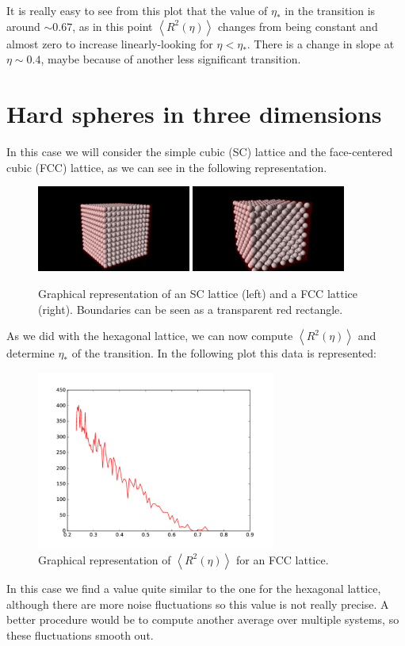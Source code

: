 \documentclass[10 pt]{article}
\newcommand{\avg}[1]{\left\langle #1 \right\rangle}
\begin{document}
It is really easy to see from this plot that the value of $\eta_*$ in the transition is around $\sim 0.67$, as in this point $\avg{R^2(\eta)}$ changes from being constant and almost zero to increase linearly-looking for $\eta < \eta_*$. There is a change in slope at $\eta \sim 0.4$, maybe because of another less significant transition.

\section{Hard spheres in three dimensions}

In this case we will consider the simple cubic (SC) lattice and the face-centered cubic (FCC) lattice, as we can see in the following representation.

\begin{figure}[H]
  \begin{center}
    \includegraphics[width=0.45\textwidth]{../graphs/sc.png}
    \includegraphics[width=0.45\textwidth]{../graphs/fcc.png}
    \caption{Graphical representation of an SC lattice (left) and a FCC lattice (right). Boundaries can be seen as a transparent red rectangle.}
  \end{center}
\end{figure}

As we did with the hexagonal lattice, we can now compute $\avg{R^2(\eta)}$ and determine $\eta_*$ of the transition. In the following plot this data is represented:

\begin{figure}[H]
  \begin{center}
    \includegraphics[width=0.7\textwidth]{../graphs/fcc-melting.pdf}
    \caption{Graphical representation of $\avg{R^2(\eta)}$ for an FCC lattice.}
  \end{center}
\end{figure}

In this case we find a value quite similar to the one for the hexagonal lattice, although there are more noise fluctuations so this value is not really precise. A better procedure would be to compute another average over multiple systems, so these fluctuations smooth out.
\end{document}

